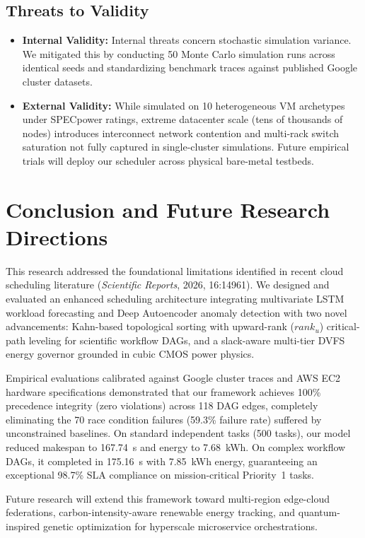 \documentclass[default,sn-mathphys-num]{sn-jnl}
\theoremstyle{thmstyleone}
\theoremstyle{thmstyletwo}
\theoremstyle{thmstylethree}
\begin{document}
\subsection{Threats to Validity}
\begin{itemize}
    \item \textbf{Internal Validity:} Internal threats concern stochastic simulation variance. We mitigated this by conducting 50 Monte Carlo simulation runs across identical seeds and standardizing benchmark traces against published Google cluster datasets.
    \item \textbf{External Validity:} While simulated on 10 heterogeneous VM archetypes under SPECpower ratings, extreme datacenter scale (tens of thousands of nodes) introduces interconnect network contention and multi-rack switch saturation not fully captured in single-cluster simulations. Future empirical trials will deploy our scheduler across physical bare-metal testbeds.
\end{itemize}

\section{Conclusion and Future Research Directions}\label{sec:conclusion}

This research addressed the foundational limitations identified in recent cloud scheduling literature (\textit{Scientific Reports}, 2026, 16:14961). We designed and evaluated an enhanced scheduling architecture integrating multivariate LSTM workload forecasting and Deep Autoencoder anomaly detection with two novel advancements: Kahn-based topological sorting with upward-rank ($rank_u$) critical-path leveling for scientific workflow DAGs, and a slack-aware multi-tier DVFS energy governor grounded in cubic CMOS power physics.

Empirical evaluations calibrated against Google cluster traces and AWS EC2 hardware specifications demonstrated that our framework achieves 100\% precedence integrity (zero violations) across 118 DAG edges, completely eliminating the 70 race condition failures (59.3\% failure rate) suffered by unconstrained baselines. On standard independent tasks (500 tasks), our model reduced makespan to 167.74~s and energy to 7.68~kWh. On complex workflow DAGs, it completed in 175.16~s with 7.85~kWh energy, guaranteeing an exceptional 98.7\% SLA compliance on mission-critical Priority~1 tasks.

Future research will extend this framework toward multi-region edge-cloud federations, carbon-intensity-aware renewable energy tracking, and quantum-inspired genetic optimization for hyperscale microservice orchestrations.
\end{document}
